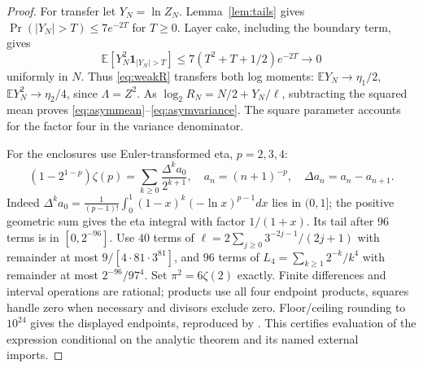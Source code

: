 \documentclass[11pt,a4paper]{article}
\numberwithin{equation}{section}
\theoremstyle{remark}
\newcommand{\E}{\mathbb E}
\begin{document}
\begin{proof}
For transfer let $Y_N=\ln Z_N$.
Lemma~\ref{lem:tails} gives $\Pr(|Y_N|>T)\le7e^{-2T}$ for $T\ge0$.
Layer cake, including the boundary term, gives
\[
\E[Y_N^2\mathbf1_{|Y_N|>T}]
\le7(T^2+T+1/2)e^{-2T}\longrightarrow0
\]
uniformly in $N$. Thus \eqref{eq:weakR} transfers both log moments:
$\E Y_N\to\eta_1/2$, $\E Y_N^2\to\eta_2/4$, since $\Lambda=Z^2$.
As $\log_2R_N=N/2+Y_N/\ell$, subtracting the squared mean proves
\eqref{eq:asymmean}--\eqref{eq:asymvariance}. The square parameter
accounts for the factor four in the variance denominator.

For the enclosures use Euler-transformed eta, $p=2,3,4$:
\[
(1-2^{1-p})\zeta(p)=\sum_{k\ge0}\frac{\Delta^ka_0}{2^{k+1}},
\quad a_n=(n+1)^{-p},\quad\Delta a_n=a_n-a_{n+1}.
\]
Indeed $\Delta^ka_0=\frac1{(p-1)!}\int_0^1(1-x)^k(-\ln x)^{p-1}dx$
lies in $(0,1]$; the positive geometric sum gives the eta integral
with factor $1/(1+x)$. Its tail after $96$ terms is in $[0,2^{-96}]$.
Use $40$ terms of $\ell=2\sum_{j\ge0}3^{-2j-1}/(2j+1)$ with
remainder at most $9/[4\cdot81\cdot3^{81}]$, and $96$ terms of
$L_4=\sum_{k\ge1}2^{-k}/k^4$ with remainder at most $2^{-96}/97^4$.
Set $\pi^2=6\zeta(2)$ exactly. Finite differences and interval
operations are rational; products use all four endpoint products,
squares handle zero when necessary and divisors exclude zero.
Floor/ceiling rounding to $10^{24}$ gives the displayed endpoints,
reproduced by . This certifies
evaluation of the expression conditional on the analytic theorem
and its named external imports.
\end{proof}
\end{document}
